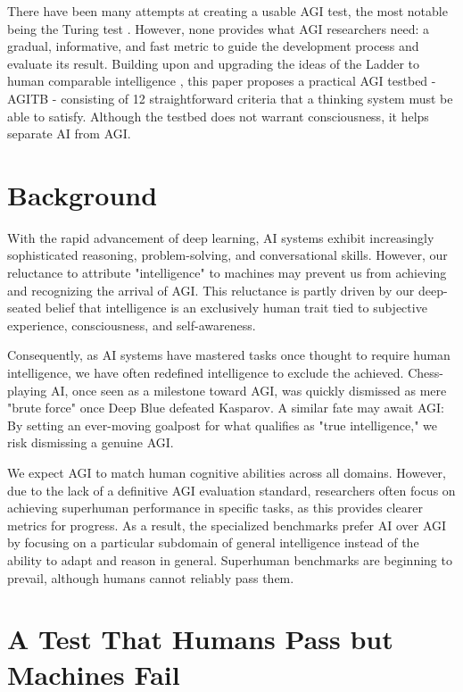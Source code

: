 \documentclass{article}
\begin{document}
There have been many attempts at creating a usable AGI test, the most notable being the Turing test \cite{Turing1950}. However, none provides what AGI researchers need: a gradual, informative, and fast metric to guide the development process and evaluate its result. Building upon and upgrading the ideas of the Ladder to human comparable intelligence \cite{Sprogar2018}, this paper proposes a practical AGI testbed - AGITB - consisting of 12 straightforward criteria that a thinking system must be able to satisfy. Although the testbed does not warrant consciousness, it helps separate AI from AGI.


\section{Background}

With the rapid advancement of deep learning, AI systems exhibit increasingly sophisticated reasoning, problem-solving, and conversational skills. However, our reluctance to attribute "intelligence" to machines may prevent us from achieving and recognizing the arrival of AGI. This reluctance is partly driven by our deep-seated belief that intelligence is an exclusively human trait tied to subjective experience, consciousness, and self-awareness. 

Consequently, as AI systems have mastered tasks once thought to require human intelligence, we have often redefined intelligence to exclude the achieved. Chess-playing AI, once seen as a milestone toward AGI, was quickly dismissed as mere "brute force" once Deep Blue defeated Kasparov. A similar fate may await AGI: By setting an ever-moving goalpost for what qualifies as "true intelligence," we risk dismissing a genuine AGI. 

We expect AGI to match human cognitive abilities across all domains. However, due to the lack of a definitive AGI evaluation standard, researchers often focus on achieving superhuman performance in specific tasks, as this provides clearer metrics for progress. As a result, the specialized benchmarks prefer AI over AGI by focusing on a particular subdomain of general intelligence instead of the ability to adapt and reason in general. Superhuman benchmarks are beginning to prevail, although humans cannot reliably pass them.

\section{A Test That Humans Pass but Machines Fail}
\end{document}
